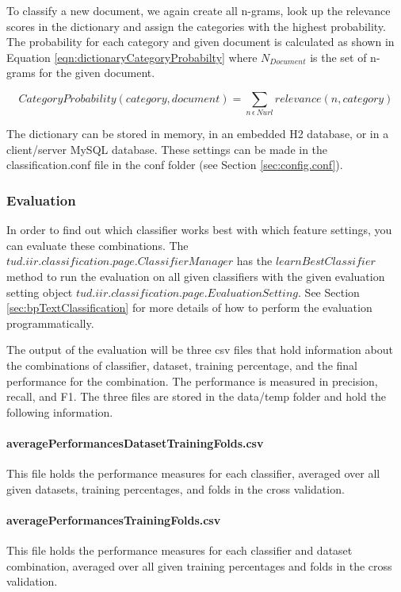 \documentclass[a4paper,twoside]{book}      %
\begin{document}
To classify a new document, we again create all n-grams, look up the relevance scores in the dictionary and assign the categories with the highest probability. The probability for each category and given document is calculated as shown in Equation \ref{eqn:dictionaryCategoryProbabilty} where $N_{Document}$ is the set of n-grams for the given document.

\begin{equation}
\label{eqn:dictionaryCategoryProbabilty}
\mbox{$CategoryProbability(category,document)$} = \sum_{n\,\epsilon\, Nurl} \mbox{$relevance(n,category)$}
\end{equation}

The dictionary can be stored in memory, in an embedded H2 database, or in a client/server MySQL database. These settings can be made in the classification.conf file in the conf folder (see Section \ref{sec:config.conf}).


\subsubsection{Evaluation}
In order to find out which classifier works best with which feature settings, you can evaluate these combinations. The $tud.iir.classification.page.ClassifierManager$ has the $learnBestClassifier$ method to run the evaluation on all given classifiers with the given evaluation setting object $tud.iir.classification.page.EvaluationSetting$. See Section \ref{sec:bpTextClassification} for more details of how to perform the evaluation programmatically.

The output of the evaluation will be three csv files that hold information about the combinations of classifier, dataset, training percentage, and the final performance for the combination. The performance is measured in precision, recall, and F1. The three files are stored in the data/temp folder and hold the following information.

\paragraph{averagePerformancesDatasetTrainingFolds.csv} This file holds the performance measures for each classifier, averaged over all given datasets, training percentages, and folds in the cross validation.

\paragraph{averagePerformancesTrainingFolds.csv} This file holds the performance measures for each classifier and dataset combination, averaged over all given training percentages and folds in the cross validation.
\end{document}
